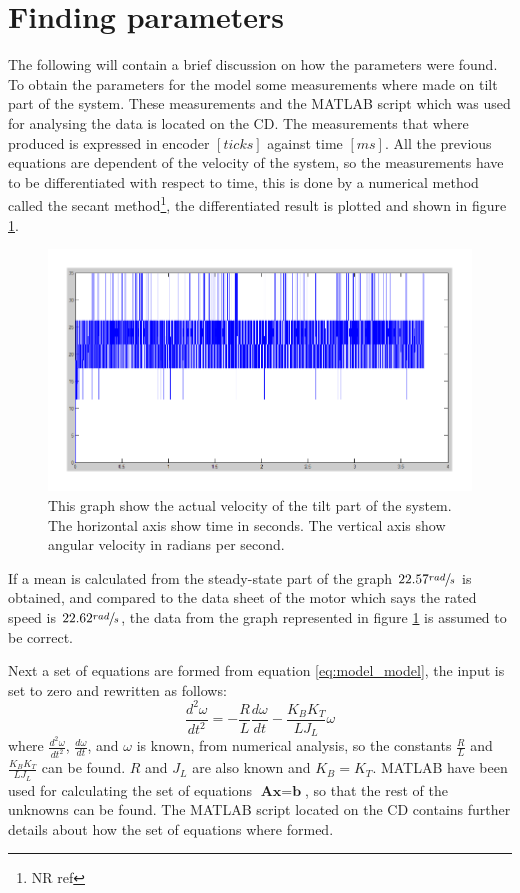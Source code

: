 \section{Finding parameters}
The following will contain a brief discussion on how the parameters were found. To obtain the parameters for the model some measurements where made on tilt part of the system. These measurements and the MATLAB script which was used for analysing the data is located on the CD. The measurements that where produced is expressed in encoder $[ticks]$ against time $[ms]$. All the previous equations are dependent of the velocity of the system, so the measurements have to be differentiated with respect to time, this is done by a numerical method called the secant method\footnote{NR ref}, the differentiated result is plotted and shown in figure \ref{fig:measured_step_tilt}.
\begin{figure}[htb]
	\begin{center}
	\includegraphics[scale=1,trim=0 0 0 0]{graphics/measured_step_tilt.pdf} %
	\caption{This graph show the actual velocity of the tilt part of the system. The horizontal axis show time in seconds. The vertical axis show angular velocity in radians per second.}
	\label{fig:measured_step_tilt}			%
	\end{center}
\end{figure}
If a mean is calculated from the steady-state part of the graph $22.57 \sfrac{rad}{s}$ is obtained, and compared to the data sheet of the motor which says the rated speed is $22.62 \sfrac{rad}{s}$, the data from the graph represented in figure \ref{fig:measured_step_tilt} is assumed to be correct.

Next a set of equations are formed from equation \ref{eq:model_model}, the input is set to zero and rewritten as follows:
\begin{equation}
	\frac{d^{2}\omega}{dt^{2}} = - \frac{R}{L} \frac{d\omega}{dt} - \frac{K_B K_T}{L J_L} \omega
\end{equation}
where $\frac{d^{2}\omega}{dt^{2}}$, $\frac{d\omega}{dt}$, and $\omega$ is known, from numerical analysis, so the constants $\frac{R}{L}$ and $\frac{K_B K_T}{L J_L}$ can be found. $R$ and $J_L$ are also known and $K_B = K_T$. MATLAB have been used for calculating the set of equations $\textbf{Ax} = \textbf{b}$, so that the rest of the unknowns can be found. The MATLAB script located on the CD contains further details about how the set of equations where formed.

